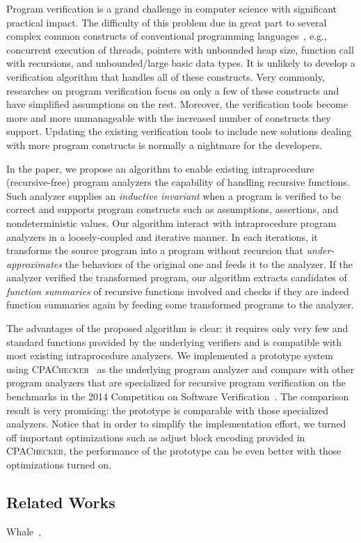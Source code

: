 Program verification is a grand challenge in computer science with significant practical impact. 
The difficulty of this problem due in great part to several complex common constructs of conventional programming languages~\cite{ClarkeJS05}, e.g., concurrent execution of threads, pointers with unbounded heap size, function call with recursions, and unbounded/large basic data types. It is unlikely to develop a verification algorithm that handles all of these constructs. Very commonly, researches on program verification focus on only a few of these constructs and have simplified assumptions on the rest. Moreover, the verification tools become more and more unmanageable with the increased number of constructs they support. Updating the existing verification tools to include new solutions dealing with more program constructs is normally a nightmare for the developers.

In the paper, we propose an algorithm to enable existing intraprocedure (recursive-free) program analyzers the capability of handling recursive functions. 
Such analyzer supplies an \emph{inductive invariant} when a program is verified to be correct and supports program constructs such as assumptions, assertions, and nondeterministic values. Our algorithm interact with intraprocedure program analyzers in a loosely-coupled and iterative manner. 
In each iterations, it transforms the source program into a program without recursion that \emph{under-approximates} the behaviors of the original one and feeds it to the analyzer.
If the analyzer verified the transformed program, our algorithm extracts candidates of \emph{function summaries} of recursive functions involved and checks if they are indeed function summaries again by feeding some transformed programs to the analyzer. 

The advantages of the proposed algorithm is clear: it requires only very few and standard functions provided by the underlying verifiers and is compatible with most existing intraprocedure analyzers. We implemented a prototype system using \textsc{CPAChecker}~\cite{BeyerK11} as the underlying program analyzer and compare
with other program analyzers that are specialized for recursive program verification on the benchmarks in the 2014 Competition on Software Verification~\cite{svcomp14}.
The comparison result is very promising: the prototype is comparable with those specialized analyzers. Notice that in order to simplify the implementation effort, we turned off important optimizations such as adjust block encoding provided in \textsc{CPAChecker}, the performance of the prototype can be even better with those optimizations turned on. 

\subsection*{Related Works}
Whale~\cite{AlbarghouthiGC12},





